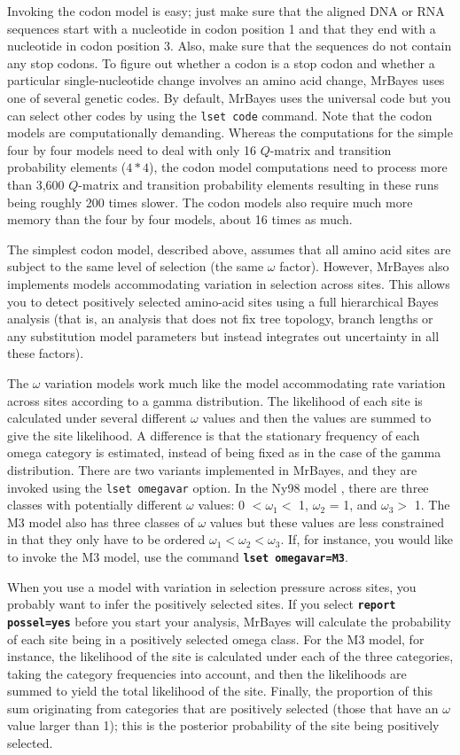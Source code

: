 \documentclass[12pt]{book}
\newcommand{\ttt}[1]{\texttt{#1}}
\newcommand{\tb}[1]{\ttt{\textbf{#1}}}
\begin{document}
Invoking the codon model is easy; just make sure that the aligned DNA or RNA sequences start with a
nucleotide in codon position 1 and that they end with a nucleotide in codon position 3. Also, make
sure that the sequences do not contain any stop codons. To figure out whether a codon is a stop
codon and whether a particular single-nucleotide change involves an amino acid change, MrBayes uses
one of several genetic codes. By default, MrBayes uses the universal code but you can select other
codes by using the \ttt{lset code} command. Note that the codon models are computationally
demanding. Whereas the computations for the simple four by four models need to deal with only 16
$Q$-matrix and transition probability elements ($4*4$), the codon model computations need to
process more than 3,600 $Q$-matrix and transition probability elements resulting in these runs
being roughly 200 times slower. The codon models also require much more memory than the four by
four models, about 16 times as much.

The simplest codon model, described above, assumes that all amino acid sites are subject to the
same level of selection (the same $\omega$ factor). However, MrBayes also implements models
accommodating variation in selection across sites. This allows you to detect positively selected
amino-acid sites using a full hierarchical Bayes analysis (that is, an analysis that does not fix
tree topology, branch lengths or any substitution model parameters but instead integrates out
uncertainty in all these factors).

The $\omega$ variation models work much like the model accommodating rate variation across sites
according to a gamma distribution. The likelihood of each site is calculated under several
different $\omega$ values and then the values are summed to give the site likelihood. A difference
is that the stationary frequency of each omega category is estimated, instead of being fixed as in
the case of the gamma distribution. There are two variants implemented in MrBayes, and they are
invoked using the \ttt{lset omegavar} option. In the Ny98 model \citep{nielsen98}, there are three
classes with potentially different $\omega$ values: 0 $< \omega_1 <$ 1, $\omega_2$ = 1, and
$\omega_3 >$ 1. The M3 model also has three classes of $\omega$ values but these values are less
constrained in that they only have to be ordered $\omega_1 < \omega_2 < \omega_3$. If, for
instance, you would like to invoke the M3 model, use the command \tb{lset omegavar=M3}.

When you use a model with variation in selection pressure across sites, you probably want to infer
the positively selected sites. If you select \tb{report possel=yes} before you start your analysis,
MrBayes will calculate the probability of each site being in a positively selected omega class. For
the M3 model, for instance, the likelihood of the site is calculated under each of the three
categories, taking the category frequencies into account, and then the likelihoods are summed to
yield the total likelihood of the site. Finally, the proportion of this sum originating from
categories that are positively selected (those that have an $\omega$ value larger than 1); this is
the posterior probability of the site being positively selected.
\end{document}

